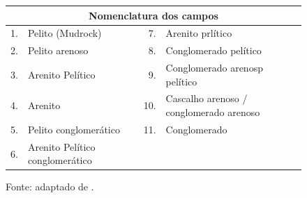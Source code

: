 \begin{figure}[H]
  \vspace{0.5em}
  \begin{tabularx}{0.98\linewidth}{@{}rX rX@{}}
    \toprule
    \multicolumn{4}{c}{\textbf{Nomenclatura dos campos}} \\
    \midrule
    1. & Pelito (Mudrock) & 7. & Arenito prlítico \\
    2. & Pelito arenoso   & 8. & Conglomerado pelítico \\
    3. & Arenito Pelítico & 9. & Conglomerado arenosp pelítico \\
    4. & Arenito          & 10. & Cascalho arenoso / conglomerado arenoso \\
    5. & Pelito conglomerático  & 11. & Conglomerado \\
    6. & Arenito Pelítico conglomerático & & \\
    \bottomrule
  \end{tabularx}
  \caption{Classificação textural de sedimentos e rochas formados por misturas de
  cascalho, areia e lama. Os limites de 5, 30 e 80\% referem-se à proporção de
  cascalho.}
  \label{fig:classificacao-conglomerados}
  \caption*{\footnotesize Fonte: adaptado de \textcite{nichols2009}.}
\end{figure}
